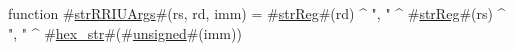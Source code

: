 function #\hyperref[zstrRRIUArgs]{strRRIUArgs}#(rs, rd, imm) = #\hyperref[zstrReg]{strReg}#(rd) ^ ", " ^ #\hyperref[zstrReg]{strReg}#(rs) ^ ", " ^ #\hyperref[zhexzystr]{hex\_str}#(#\hyperref[zunsigned]{unsigned}#(imm))

